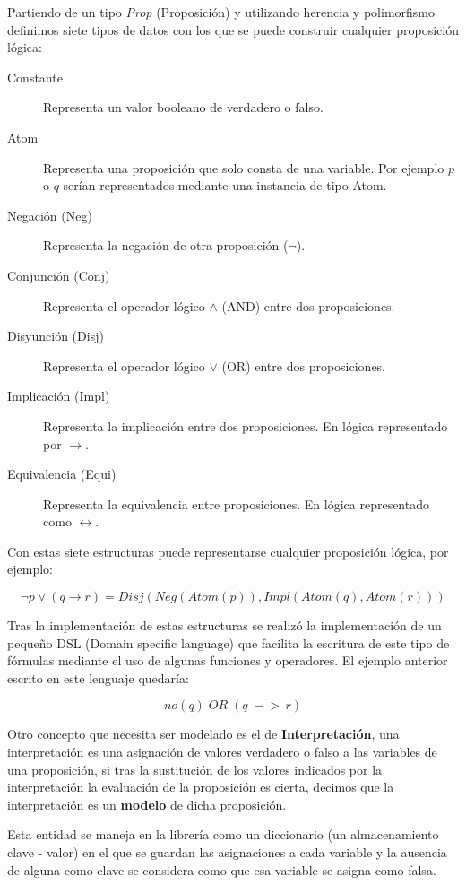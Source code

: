 	Partiendo de un tipo \textit{Prop} (Proposición) y utilizando herencia y polimorfismo definimos siete tipos de datos con los que se puede construir cualquier proposición lógica:
	
	\begin{description}
		\item[Constante] Representa un valor booleano de verdadero o falso.
		\item[Atom] Representa una proposición que solo consta de una variable. Por ejemplo $p$ o $q$ serían representados mediante una instancia de tipo Atom.
		\item[Negación (Neg)] Representa la negación de otra proposición ($\neg$).
		\item[Conjunción (Conj)] Representa el operador lógico $\wedge$ (AND) entre dos proposiciones.
		\item[Disyunción (Disj)] Representa el operador lógico $\vee$ (OR) entre dos proposiciones.
		\item[Implicación (Impl)] Representa la implicación entre dos proposiciones. En lógica representado por $\rightarrow$.
		\item[Equivalencia (Equi)] Representa la equivalencia entre proposiciones. En lógica representado como $\leftrightarrow$.
	\end{description}

	Con estas siete estructuras puede representarse cualquier proposición lógica, por ejemplo:
	
	\[
		\neg p \vee (q \rightarrow r) = Disj(Neg(Atom(p)), Impl(Atom(q), Atom(r)))
	\]
	
	Tras la implementación de estas estructuras se realizó la implementación de un pequeño DSL (Domain specific language) que facilita la escritura de este tipo de fórmulas mediante el uso de algunas funciones y operadores. El ejemplo anterior escrito en este lenguaje quedaría: 
	
	\[
		no(q) \; OR \; (q \; -\!\!> \, r) 
	\]
	
	Otro concepto que necesita ser modelado es el de \textbf{Interpretación}, una interpretación es una asignación de valores verdadero o falso a las variables de una proposición, si tras la sustitución de los valores indicados por la interpretación la evaluación de la proposición es cierta, decimos que la interpretación es un \textbf{modelo} de dicha proposición.
	
	Esta entidad se maneja en la librería como un diccionario (un almacenamiento clave - valor) en el que se guardan las asignaciones a cada variable y la ausencia de alguna como clave se considera como que esa variable se asigna como falsa.
	

